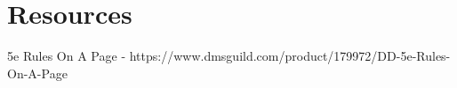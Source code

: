 \onecolumn
\section{Resources}

5e Rules On A Page - https://www.dmsguild.com/product/179972/DD-5e-Rules-On-A-Page
